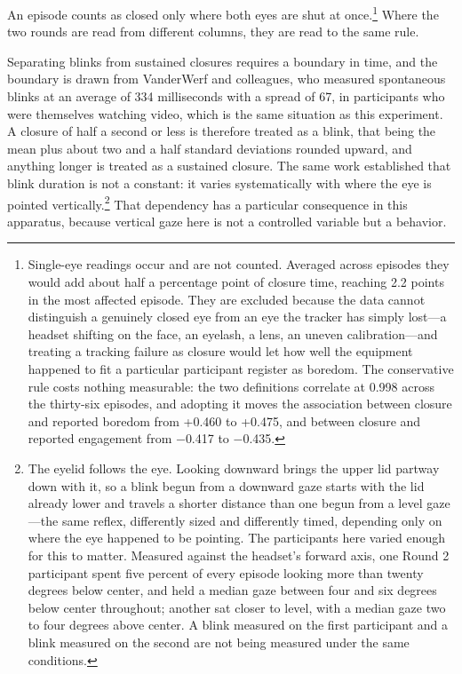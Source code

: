 An episode counts as closed only where both eyes are shut at once.\footnote{Single-eye readings
occur and are not counted. Averaged across episodes they would add about half a percentage point
of closure time, reaching 2.2 points in the most affected episode. They are excluded because the
data cannot distinguish a genuinely closed eye from an eye the tracker has simply lost---a
headset shifting on the face, an eyelash, a lens, an uneven calibration---and treating a
tracking failure as closure would let how well the equipment happened to fit a particular
participant register as boredom. The conservative rule costs nothing measurable: the two
definitions correlate at 0.998 across the thirty-six episodes, and adopting it moves the
association between closure and reported boredom from +0.460 to +0.475, and between closure and
reported engagement from $-$0.417 to $-$0.435.} Where the two rounds are read from different
columns, they are read to the same rule.

Separating blinks from sustained closures requires a boundary in time, and the boundary is
drawn from VanderWerf and colleagues, who measured spontaneous blinks at an average of 334
milliseconds with a spread of 67, in participants who were themselves watching video, which is
the same situation as this experiment. A closure of half a second or less is therefore treated
as a blink, that being the mean plus about two and a half standard deviations rounded upward,
and anything longer is treated as a sustained closure. The same work established that blink
duration is not a constant: it varies systematically with where the eye is pointed
vertically.\footnote{The eyelid follows the eye. Looking downward brings the upper lid partway
down with it, so a blink begun from a downward gaze starts with the lid already lower and
travels a shorter distance than one begun from a level gaze---the same reflex, differently
sized and differently timed, depending only on where the eye happened to be pointing. The
participants here varied enough for this to matter. Measured against the headset's forward axis,
one Round 2 participant spent five percent of every episode looking more than twenty degrees
below center, and held a median gaze between four and six degrees below center throughout;
another sat closer to level, with a median gaze two to four degrees above center. A blink
measured on the first participant and a blink measured on the second are not being measured
under the same conditions.} That dependency has a particular consequence in this apparatus,
because vertical gaze here is not a controlled variable but a behavior.


